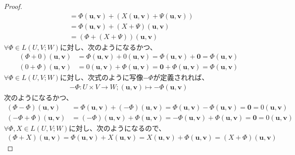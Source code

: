 \documentclass[dvipdfmx]{jsarticle}
\begin{document}
\begin{proof}
\begin{align*}
&= \varPhi\left( \mathbf{u},\mathbf{v} \right) + \left( X\left( \mathbf{u},\mathbf{v} \right) + \varPsi\left( \mathbf{u},\mathbf{v} \right) \right)\\
&= \varPhi\left( \mathbf{u},\mathbf{v} \right) + (X + \varPsi)\left( \mathbf{u},\mathbf{v} \right)\\
&= \left( \varPhi + (X + \varPsi) \right)\left( \mathbf{u},\mathbf{v} \right)
\end{align*}
$\forall\varPhi \in L(U,V;W)$に対し、次のようになるかつ、
\begin{align*}
(\varPhi + 0)\left( \mathbf{u},\mathbf{v} \right) &= \varPhi\left( \mathbf{u},\mathbf{v} \right) + 0\left( \mathbf{u},\mathbf{v} \right) = \varPhi\left( \mathbf{u},\mathbf{v} \right) + \mathbf{0} = \varPhi\left( \mathbf{u},\mathbf{v} \right)\\
(0 + \varPhi)\left( \mathbf{u},\mathbf{v} \right) &= 0\left( \mathbf{u},\mathbf{v} \right) + \varPhi\left( \mathbf{u},\mathbf{v} \right) = \mathbf{0} + \varPhi\left( \mathbf{u},\mathbf{v} \right) = \varPhi\left( \mathbf{u},\mathbf{v} \right)
\end{align*}
$\forall\varPhi \in L(U,V;W)$に対し、次式のように写像$- \varPhi$が定義されれば、
\begin{align*}
- \varPhi:U \times V \rightarrow W;\left( \mathbf{u},\mathbf{v} \right) \mapsto - \varPhi\left( \mathbf{u},\mathbf{v} \right)
\end{align*}
次のようになるかつ、
\begin{align*}
(\varPhi - \varPhi)\left( \mathbf{u},\mathbf{v} \right) &= \varPhi\left( \mathbf{u},\mathbf{v} \right) + ( - \varPhi)\left( \mathbf{u},\mathbf{v} \right) = \varPhi\left( \mathbf{u},\mathbf{v} \right) - \varPhi\left( \mathbf{u},\mathbf{v} \right) = \mathbf{0} = 0\left( \mathbf{u},\mathbf{v} \right)\\
( - \varPhi + \varPhi)\left( \mathbf{u},\mathbf{v} \right) &= ( - \varPhi)\left( \mathbf{u},\mathbf{v} \right) + \varPhi\left( \mathbf{u},\mathbf{v} \right) = - \varPhi\left( \mathbf{u},\mathbf{v} \right) + \varPhi\left( \mathbf{u},\mathbf{v} \right) = \mathbf{0} = 0\left( \mathbf{u},\mathbf{v} \right)
\end{align*}
$\forall\varPhi,X \in L(U,V;W)$に対し、次のようになるので、
\begin{align*}
(\varPhi + X)\left( \mathbf{u},\mathbf{v} \right) = \varPhi\left( \mathbf{u},\mathbf{v} \right) + X\left( \mathbf{u},\mathbf{v} \right) = X\left( \mathbf{u},\mathbf{v} \right) + \varPhi\left( \mathbf{u},\mathbf{v} \right) = (X + \varPhi)\left( \mathbf{u},\mathbf{v} \right)

\end{align*}
\end{proof}
\end{document}
